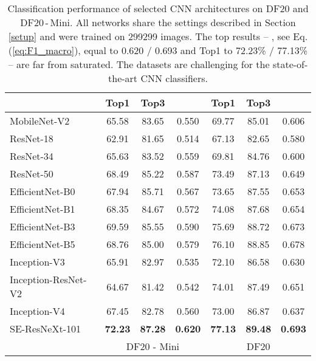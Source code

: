 \documentclass[10pt,twocolumn,letterpaper]{article}
\begin{document}
\begin{table}[b]
\footnotesize
\begin{center}
\setlength{\tabcolsep}{0.3em} \renewcommand{\arraystretch}{1.17}
\begin{tabular}{|l| c | c | c || c | c | c |}
\cline{2-7}
    \multicolumn{1}{c|}{ } & \textbf{Top1} & \textbf{Top3} & \,\,\textbf{}\,\, &  \textbf{Top1} & \textbf{Top3} & \,\,\textbf{}\,\,  \\
    \hline
    MobileNet-V2          & \,65.58\, & \,83.65\, & \,0.550\, & \,69.77\, & \,85.01\, & \,0.606\, \\
    \hline 
	ResNet-18             & 62.91 & 81.65 & 0.514 & 67.13 & 82.65 & 0.580 \\
	ResNet-34             & 65.63 & 83.52 & 0.559 & 69.81 & 84.76 & 0.600 \\
	ResNet-50             & 68.49 & 85.22 & 0.587 & 73.49 & 87.13 & 0.649 \\
	\hline
	EfficientNet-B0       & 67.94 & 85.71 & 0.567 & 73.65 & 87.55 & 0.653 \\
	EfficientNet-B1       & 68.35 & 84.67 & 0.572 & 74.08 & 87.68 & 0.654 \\
	EfficientNet-B3       & 69.59 & 85.55 & 0.590 & 75.69 & 88.72 & 0.673 \\
	EfficientNet-B5       & 68.76 & 85.00 & 0.579 & 76.10 & 88.85 & 0.678 \\
	\hline 
	Inception-V3          & 65.91 & 82.97 & 0.535 & 72.10 & 86.58 & 0.630 \\
	Inception-ResNet-V2\, & 64.67 & 81.42 & 0.542 & 74.01 & 87.49 & 0.651 \\
	Inception-V4          & 67.45 & 82.78 & 0.560 & 73.00 & 86.87 & 0.637 \\ 
	\hline
	SE-ResNeXt-101 & \textbf{72.23} & \textbf{87.28} & \textbf{0.620} & \textbf{77.13} & \textbf{89.48} & \textbf{0.693} \\ \hline	
\multicolumn{1}{c}{ } & \multicolumn{3}{|c||}{DF20 - Mini} & \multicolumn{3}{c|}{DF20} \\
 \cline{2-7}
\end{tabular}
\end{center}
\caption{Classification performance of selected CNN architectures on DF20 and DF20\,-\,Mini. All networks share the settings described in Section \ref{setup} and were trained on 299299 images. The top results  -- , see Eq. (\ref{eq:F1_macro}), equal to 0.620 / 0.693 and Top1 to 72.23\% / 77.13\% -- are far from saturated. The datasets are challenging for the state-of-the-art CNN classifiers.}
\label{table:results}
\end{table}
\end{document}
